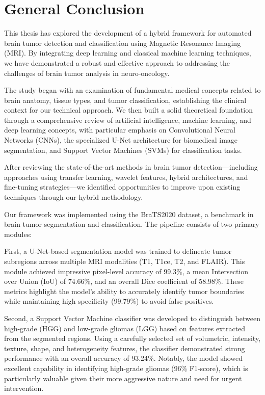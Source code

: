 \chapter*{General Conclusion}

This thesis has explored the development of a hybrid framework for automated brain tumor detection and classification using Magnetic Resonance Imaging (MRI). By integrating deep learning and classical machine learning techniques, we have demonstrated a robust and effective approach to addressing the challenges of brain tumor analysis in neuro-oncology.

The study began with an examination of fundamental medical concepts related to brain anatomy, tissue types, and tumor classification, establishing the clinical context for our technical approach. We then built a solid theoretical foundation through a comprehensive review of artificial intelligence, machine learning, and deep learning concepts, with particular emphasis on Convolutional Neural Networks (CNNs), the specialized U-Net architecture for biomedical image segmentation, and Support Vector Machines (SVMs) for classification tasks.

After reviewing the state-of-the-art methods in brain tumor detection—including approaches using transfer learning, wavelet features, hybrid architectures, and fine-tuning strategies—we identified opportunities to improve upon existing techniques through our hybrid methodology.

Our framework was implemented using the BraTS2020 dataset, a benchmark in brain tumor segmentation and classification. The pipeline consists of two primary modules:

First, a U-Net-based segmentation model was trained to delineate tumor subregions across multiple MRI modalities (T1, T1ce, T2, and FLAIR). This module achieved impressive pixel-level accuracy of 99.3\%, a mean Intersection over Union (IoU) of 74.66\%, and an overall Dice coefficient of 58.98\%. These metrics highlight the model's ability to accurately identify tumor boundaries while maintaining high specificity (99.79\%) to avoid false positives.

Second, a Support Vector Machine classifier was developed to distinguish between high-grade (HGG) and low-grade gliomas (LGG) based on features extracted from the segmented regions. Using a carefully selected set of volumetric, intensity, texture, shape, and heterogeneity features, the classifier demonstrated strong performance with an overall accuracy of 93.24\%. Notably, the model showed excellent capability in identifying high-grade gliomas (96\% F1-score), which is particularly valuable given their more aggressive nature and need for urgent intervention.

